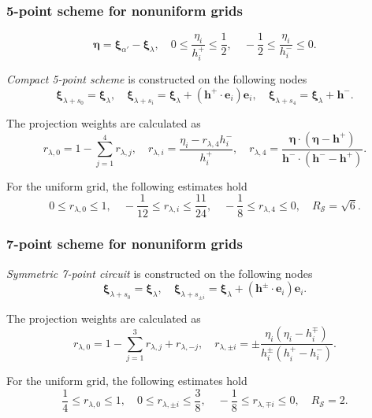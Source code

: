 \documentclass[mathserif]{beamer} %
\newcommand{\bxi}{\boldsymbol{\xi}}
\newcommand{\bh}{\boldsymbol{h}}
\newcommand{\be}{\boldsymbol{e}}
\begin{document}
\begin{frame}
    \frametitle{5-point scheme for nonuniform grids}
    \begin{equation}\label{eq:eta_definition}
        \boldsymbol{\eta} = \bxi_{\alpha'} - \bxi_{\lambda}, \quad
        0 \leq \frac{\eta_i}{h^+_i} \leq \frac12, \quad
        -\frac12 \leq \frac{\eta_i}{h^-_i} \leq 0.
    \end{equation}\pause

    \emph{Compact 5-point scheme} is constructed on the following nodes
    \begin{equation}\label{eq:stencil_nodes_5}
        \bxi_{\lambda+s_0} = \bxi_{\lambda}, \quad
        \bxi_{\lambda+s_i} = \bxi_{\lambda} + (\bh^+\cdot \be_i)\be_i, \quad
        \bxi_{\lambda+s_4} = \bxi_{\lambda} + \bh^-.
    \end{equation}

    The projection weights are calculated as
    \begin{equation}\label{eq:stencil_weights_5}
        r_{\lambda,0} = 1 - \sum_{j=1}^4 r_{\lambda,j}, \quad
        r_{\lambda,i} = \frac{\eta_i - r_{\lambda,4}h^-_i}{h^+_i}, \quad
        r_{\lambda,4} = \frac{\boldsymbol{\eta}\cdot(\boldsymbol{\eta} - \bh^+)}
            {\bh^-\cdot(\bh^- - \bh^+)}.
    \end{equation}
    \vspace{-20pt}\pause

    For the uniform grid, the following estimates hold
    \begin{equation}\label{eq:weights_ranges_5}
        0 \leq r_{\lambda,0} \leq 1, \quad
        -\frac1{12} \leq r_{\lambda,i} \leq \frac{11}{24}, \quad
        -\frac18 \leq r_{\lambda,4} \leq 0, \quad
        R_\mathcal{S} = \sqrt{6}.
    \end{equation}
\end{frame}

\begin{frame}
    \frametitle{7-point scheme for nonuniform grids}
    \emph{Symmetric 7-point circuit} is constructed on the following nodes
    \begin{equation}\label{eq:stencil_nodes_7}
        \bxi_{\lambda+s_0} = \bxi_{\lambda}, \quad
        \bxi_{\lambda+s_{\pm i}} = \bxi_{\lambda} + (\bh^\pm\cdot \be_i)\be_i.
    \end{equation}

    The projection weights are calculated as
    \begin{equation}\label{eq:stencil_weights_7}
        r_{\lambda,0} = 1 - \sum_{j=1}^3 r_{\lambda,j} + r_{\lambda,-j}, \quad
        r_{\lambda,\pm i} = \pm\frac{\eta_i(\eta_i - h^\mp_i)}{h^\pm_i(h^+_i-h^-_i)}.
    \end{equation}
    \pause

    For the uniform grid, the following estimates hold
    \begin{equation}\label{eq:weights_ranges_7}
        \frac14 \leq r_{\lambda,0} \leq 1, \quad
        0 \leq r_{\lambda,\pm i} \leq \frac38, \quad
        -\frac18 \leq r_{\lambda,\mp i} \leq 0, \quad
        R_\mathcal{S} = 2.
    \end{equation}
\end{frame}
\end{document}

